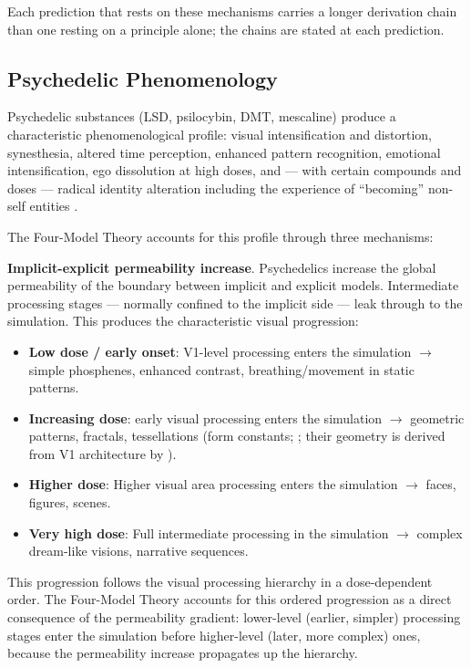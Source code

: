\documentclass[12pt]{article}
\begin{document}
Each prediction that rests on these mechanisms carries a longer derivation chain than one resting on a principle alone; the chains are stated at each prediction.


\subsection{Psychedelic Phenomenology}


Psychedelic substances (LSD, psilocybin, DMT, mescaline) produce a characteristic phenomenological profile: visual intensification and distortion, synesthesia, altered time perception, enhanced pattern recognition, emotional intensification, ego dissolution at high doses, and --- with certain compounds and doses --- radical identity alteration including the experience of ``becoming'' non-self entities \citep{CarhartHarris2012,CarhartHarris2016,Timmermann2019,Timmermann2023}.

The Four-Model Theory accounts for this profile through three mechanisms:

\textbf{Implicit-explicit permeability increase}. Psychedelics increase the global permeability of the boundary between implicit and explicit models. Intermediate processing stages --- normally confined to the implicit side --- leak through to the simulation. This produces the characteristic visual progression:

\begin{itemize}
\item \textbf{Low dose / early onset}: V1-level processing enters the simulation $\rightarrow$ simple phosphenes, enhanced contrast, breathing/movement in static patterns.
\item \textbf{Increasing dose}: early visual processing enters the simulation $\rightarrow$ geometric patterns, fractals, tessellations (form constants; \citealp{Kluver1966}; their geometry is derived from V1 architecture by \citealp{Bressloff2002}).
\item \textbf{Higher dose}: Higher visual area processing enters the simulation $\rightarrow$ faces, figures, scenes.
\item \textbf{Very high dose}: Full intermediate processing in the simulation $\rightarrow$ complex dream-like visions, narrative sequences.
\end{itemize}

This progression follows the visual processing hierarchy in a dose-dependent order. The Four-Model Theory accounts for this ordered progression as a direct consequence of the permeability gradient: lower-level (earlier, simpler) processing stages enter the simulation before higher-level (later, more complex) ones, because the permeability increase propagates up the hierarchy.
\end{document}
